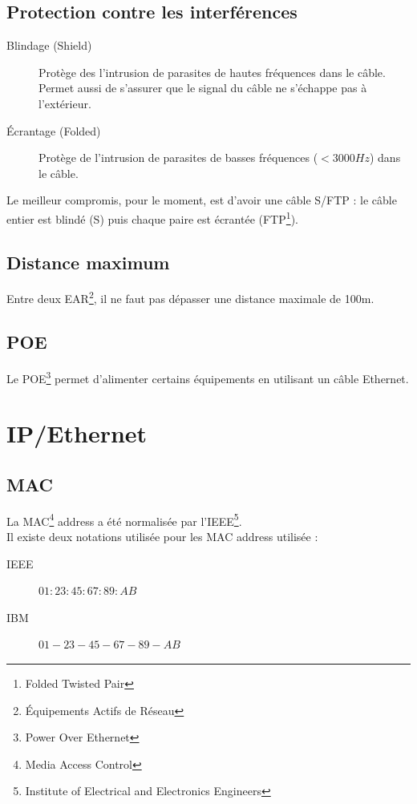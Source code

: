 \subsection{Protection contre les interférences}
\begin{description}
 \item[Blindage (Shield)] Protège des l'intrusion de parasites de hautes fréquences dans le câble. Permet aussi de s'assurer que le signal du câble ne s'échappe pas à l'extérieur.
 \item[Écrantage (Folded)] Protège de l'intrusion de parasites de basses fréquences ($< 3000Hz$) dans le câble.
\end{description}
Le meilleur compromis, pour le moment, est d'avoir une câble S/FTP : le câble entier est blindé (S) puis chaque paire est écrantée (FTP\footnote{Folded Twisted Pair}).
\subsection{Distance maximum}
Entre deux EAR\footnote{Équipements Actifs de Réseau}, il ne faut pas dépasser une distance maximale de 100m.
\subsection{POE}
Le POE\footnote{Power Over Ethernet} permet d'alimenter certains équipements en utilisant un câble Ethernet.

\section{IP/Ethernet}
\subsection{MAC}
La MAC\footnote{Media Access Control} address a été normalisée par l'IEEE\footnote{Institute of Electrical and Electronics Engineers}.\\
Il existe deux notations utilisée pour les MAC address utilisée :
\begin{description}
 \item[IEEE] $01:23:45:67:89:AB$
 \item[IBM] $01-23-45-67-89-AB$
\end{description}
